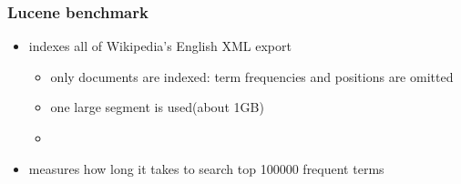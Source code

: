 \documentclass{beamer}
\begin{document}
	\begin{frame}
		\frametitle{Lucene benchmark}
		\begin{itemize}
			\item indexes all of Wikipedia's English XML export
				\begin{itemize}
					\item only documents are indexed: term frequencies and positions are omitted
					\item one large segment is used(about 1GB)
					\item 
				\end{itemize}
			\item measures how long it takes to search top 100000 frequent terms
		\end{itemize}
	\end{frame}
\end{document}
